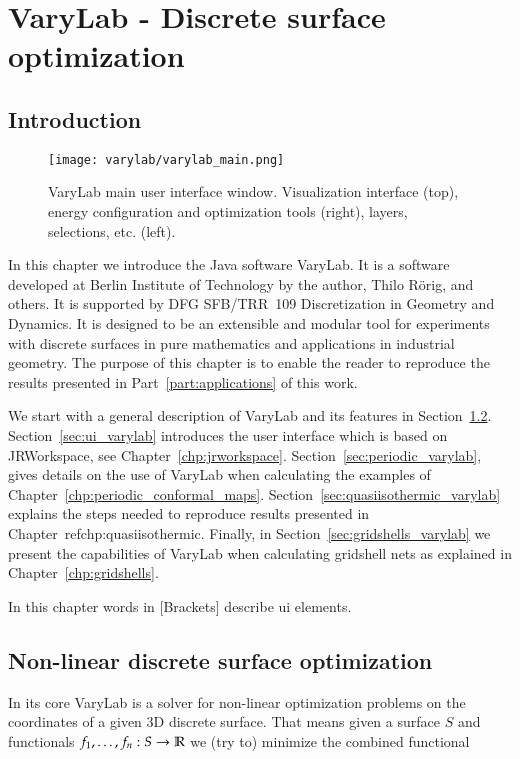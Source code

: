 \documentclass[Thesis.tex]{subfiles}
\begin{document}
\chapter{{\sc VaryLab} - Discrete surface optimization}
\label{chp:varylab}

\section{Introduction}

\begin{figure}
    \begin{center}
    \texttt{[image: varylab/varylab\_main.png]}
    \caption{{\sc VaryLab} main user interface window. Visualization interface (top), energy configuration and optimization tools (right), layers, selections, etc. (left).}
    \label{fig:varylab_main_ui}
    \end{center}
\end{figure}

In this chapter we introduce the {\sc Java} software {\sc VaryLab}. It is a software developed at Berlin Institute of Technology by the author, Thilo R\"orig, and others. It is supported by DFG \mbox{SFB/TRR}~109 Discretization in Geometry and Dynamics. It is designed to be an extensible and modular tool for experiments with discrete surfaces in pure mathematics and applications in industrial geometry. The purpose of this chapter is to enable the reader to reproduce the results presented in Part~\ref{part:applications} of this work.

We start with a general description of {\sc VaryLab} and its features in Section~\ref{sec:general_varylab}. Section~\ref{sec:ui_varylab} introduces the user interface which is based on {\sc JRWorkspace}, see Chapter~\ref{chp:jrworkspace}. Section~\ref{sec:periodic_varylab}, gives details on the use of {\sc VaryLab} when calculating the examples of Chapter~\ref{chp:periodic_conformal_maps}. Section~\ref{sec:quasiisothermic_varylab} explains the steps needed to reproduce results presented in Chapter~ref{chp:quasiisothermic}. Finally, in Section~\ref{sec:gridshells_varylab} we present the capabilities of {\sc VaryLab} when calculating gridshell nets as explained in Chapter~\ref{chp:gridshells}.

In this chapter words in [Brackets] describe ui elements.

\section{Non-linear discrete surface optimization}
\label{sec:general_varylab}
In its core {\sc VaryLab} is a solver for non-linear optimization problems on the coordinates of a given 3D discrete surface. That means given a surface $S$ and functionals $f_1,\ldots,f_n:S\to\mathbb R$ we (try to) minimize the combined functional
\end{document}
